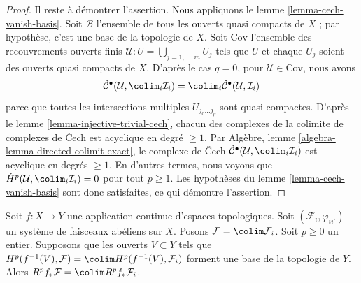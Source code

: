 \begin{proof}
\medskip\noindent

Il reste à démontrer l'assertion. Nous appliquons le lemme \ref{lemma-cech-vanish-basis}. Soit $\mathcal{B}$ l'ensemble de tous les ouverts quasi compacts de $X$ ; par hypothèse, c'est une base de la topologie de $X$. Soit $\text{Cov}$ l'ensemble des recouvrements ouverts finis
$\mathcal{U} : U = \bigcup_{j = 1, \ldots, m} U_j$ tels que $U$ et chaque $U_j$ soient des ouverts quasi compacts de $X$. D'après le cas $q = 0$,
pour $\mathcal{U} \in \text{Cov}$, nous avons
$$
\check{\mathcal{C}}^\bullet(\mathcal{U}, \colim_i \mathcal{I}_i)
=
\colim_i \check{\mathcal{C}}^\bullet(\mathcal{U}, \mathcal{I}_i)
$$
parce que toutes les intersections multiples $U_{j_0 \ldots j_p}$
sont quasi-compactes. D'après le lemme \ref{lemma-injective-trivial-cech},
chacun des complexes de la colimite de complexes de {\v C}ech est acyclique en degré $\geq 1$. Par Algèbre, lemme \ref{algebra-lemma-directed-colimit-exact},
le complexe de {\v C}ech
$\check{\mathcal{C}}^\bullet(\mathcal{U}, \colim_i \mathcal{I}_i)$
est acyclique en degrés $\geq 1$. En d'autres termes, nous voyons que
$\check{H}^p(\mathcal{U},  \colim_i \mathcal{I}_i) = 0$
pour tout $p \geq 1$. Les hypothèses du lemme \ref{lemma-cech-vanish-basis} sont donc satisfaites, ce qui démontre l'assertion.

\end{proof}

\begin{lemma}

\label{lemma-higher-direct-image-colimit}
Soit $f : X \to Y$ une application continue d'espaces topologiques. Soit $(\mathcal{F}_i, \varphi_{ii'})$ un système de faisceaux abéliens sur $X$. Posons $\mathcal{F} = \colim \mathcal{F}_i$. Soit $p \geq 0$ un entier. Supposons que les ouverts $V \subset Y$ tels que $H^p(f^{-1}(V), \mathcal{F}) = \colim H^p(f^{-1}(V), \mathcal{F}_i)$ forment une base de la topologie de $Y$. Alors $R^pf_*\mathcal{F} = \colim R^pf_*\mathcal{F}_i$.
\end{lemma}

